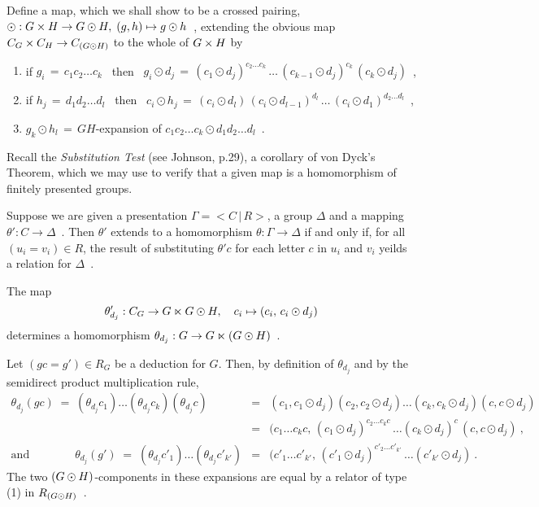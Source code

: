 \noindent
Define a map, which we shall show to be a crossed pairing, 
$\odot : G \times H \to G \odot H,\; (g,h) \mapsto g \odot h$~,
extending the obvious map  $C_G \times C_H \to C_{(G \odot H)}$  
to the whole of  $G \times H$  by 
\begin{enumerate}[{\rm (a)}]
\item\quad
if  $g_i \,=\, c_1c_2\ldots c_k$  ~then~
$g_i \odot d_j \,=\, 
 (c_1 \odot d_j)^{c_2\ldots c_k}\,\ldots\,
 (c_{k-1} \odot d_j)^{c_k}\,(c_k \odot d_j)$~,
\item\quad
if  $h_j \,=\, d_1d_2\ldots d_{l}$  ~then~
$c_i \odot h_j \,=\,
 (c_i \odot d_{l})\,(c_i \odot d_{l-1})^{d_{l}}\,\ldots\,
 (c_i \odot d_1)^{d_2\ldots d_{l}}$~,
\item\quad
$g_k \odot h_{l} \,=\, GH$-expansion of
$c_1c_2\ldots c_k \odot d_1d_2\ldots d_{l}$~.
\end{enumerate}

Recall the \emph{Substitution Test} (see Johnson, p.29),
a corollary of von Dyck's Theorem,
which we may use to verify that a given map is a homomorphism 
of finitely presented groups.

\begin{thm}
Suppose we are given a presentation  $\Gamma = <C\,|\,R>$,
a group  $\Delta$  and a mapping  $\theta' : C \to \Delta$~.
Then  $\theta'$  extends to a homomorphism
$\theta : \Gamma \to \Delta$  if and only if,
for all  $(u_i = v_i) \in R$,
the result of substituting  $\theta' c$  for each letter 
$c$  in  $u_i$  and  $v_i$  yeilds a relation for  $\Delta$~.
\end{thm}

\begin{lem} \label{lem:odot-gens}
The map
$$
\theta'_{d_j} : C_G \to G \ltimes G \odot H, \quad
c_i \mapsto (c_i,\,c_i \odot d_j)
$$
determines a homomorphism  $\theta_{d_j} : G \to G \ltimes (G \odot H)$~.
\end{lem}
\begin{pf}
Let  $(gc = g') \in R_G$  be a deduction for  $G$.  
Then, by definition of  $\theta_{d_j}$ 
and by the semidirect product multiplication rule,
\begin{eqnarray*}
\theta_{d_j}(gc)
  \;=\;  (\theta_{d_j}c_1)\ldots(\theta_{d_j}c_k)(\theta_{d_j}c)
  & = &  (c_1,c_1 \odot d_j)(c_2,c_2 \odot d_j) \ldots
           (c_k,c_k \odot d_j)(c,c \odot d_j) \\
  & = &  (c_1\ldots c_kc,\,(c_1 \odot d_j)^{c_2\ldots c_kc}\,
           \ldots (c_k \odot d_j)^{c}\,(c,c \odot d_j) ~, \\
\mbox{and}\qquad\qquad 
\theta_{d_j}(g')
  \;=\;  (\theta_{d_j}c'_1)\ldots(\theta_{d_j}c'_{k'})
  & = &  (c'_1\ldots c'_{k'},\,
          (c'_1 \odot d_j)^{c'_2\ldots c'_{k'}}\, \ldots (c'_{k'} \odot d_j) ~.
\end{eqnarray*}
The two $(G \odot H)$-components in these expansions are equal by 
a relator of type (1) in $R_{(G \odot H)}$~.
\end{pf}

